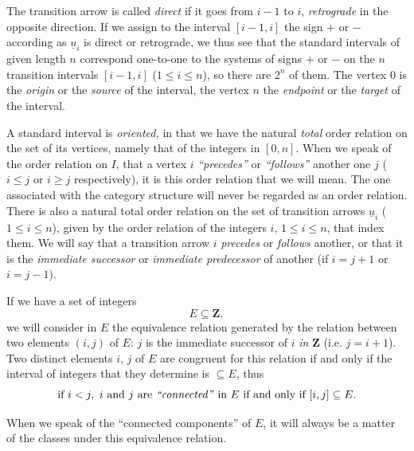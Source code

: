 \documentclass[11pt]{article}
\newcommand{\printedpage}[1]{\marginpar{\footnotesize p.~#1}}
\newcommand{\msp}[1]{\marginpar{\footnotesize [#1]}}
\begin{document}
The transition arrow is called \textit{direct} if it goes from $i-1$ to $i$, \textit{retrograde} in the opposite direction. If we assign to the interval $[i-1,i]$ the sign $+$ or $-$ according as $\underline{u}_i$ is direct or retrograde, we thus see that the
\msp{page 2}
standard intervals of given length $n$ correspond one-to-one to the systems of signs $+$ or $-$ on the $n$ transition intervals $[i-1,i]$ ($1\leq i\leq n$), so there are $2^n$ of them. The vertex $0$ is the \textit{origin} or the \textit{source} of the interval, the vertex $n$ the \textit{endpoint} or the \textit{target} of the interval.

A standard interval is \textit{oriented,} in that we have the natural \textit{total} order relation on the set of its vertices, namely that of the integers in $[0,n]$. When we speak of the order relation on $I$, that a vertex $i$ \textit{``precedes''} or \textit{``follows''} another one $j$ ($i\leq j$ or $i\geq j$ respectively), it is this order relation that we will mean. The one associated with the category structure will never be regarded as an order relation. There is also a natural total order relation on the set of transition arrows $\underline{u}_i$ ($1\leq i\leq n$), given by the order relation of the integers $i$, $1\leq i\leq n$, that index them. We will say that a transition arrow $i$ \textit{precedes} or \textit{follows} another, or that it is the \textit{immediate successor} or \textit{immediate predecessor} of another (if $i=j+1$ or $i=j-1$). %

\printedpage{2}

If we have a set of integers
\[
E\subseteq\mathbf{Z},
\]
we will consider in $E$ the equivalence relation generated by the relation between two elements $(i,j)$ of $E$: $j$ is the immediate successor of $i$ \textit{in} $\mathbf{Z}$ (i.e. $j=i+1$). Two distinct elements $i$, $j$ of $E$ are congruent for this relation if and only if the interval of integers that they determine is $\subseteq E$, thus %
\[
\text{if } i<j,\ i \text{ and } j \text{ are \textit{``connected''} in } E \text{ if and only if } [i,j]\subseteq E.
\]

\msp{page 3}
When we speak of the ``connected components'' of $E$, it will always be a matter of the classes under this equivalence relation.
\end{document}
